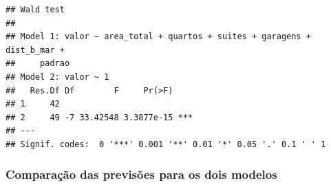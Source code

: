 \documentclass[a4paper]{article}
\begin{document}
\begin{verbatim}
## Wald test
## 
## Model 1: valor ~ area_total + quartos + suites + garagens + dist_b_mar + 
##     padrao
## Model 2: valor ~ 1
##   Res.Df Df        F     Pr(>F)    
## 1     42                           
## 2     49 -7 33.42548 3.3877e-15 ***
## ---
## Signif. codes:  0 '***' 0.001 '**' 0.01 '*' 0.05 '.' 0.1 ' ' 1
\end{verbatim}

\subsubsection{Comparação das previsões para os dois
modelos}\label{comparacao-das-previsoes-para-os-dois-modelos}

\begin{table}


\end{table}
\end{document}
